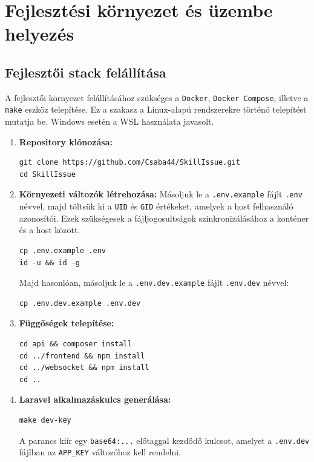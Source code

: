 \chapter{Fejlesztési környezet és üzembe helyezés}

\section{Fejlesztői stack felállítása}
A fejlesztői környezet felállításához szükséges a \texttt{Docker}, \texttt{Docker Compose}, illetve a \texttt{make} eszköz telepítése. Ez a szakasz a Linux-alapú rendszerekre történő telepítést mutatja be. Windows esetén a WSL használata javasolt.

\begin{enumerate}
    \item \textbf{Repository klónozása:}
    \begin{verbatim}
git clone https://github.com/Csaba44/SkillIssue.git
cd SkillIssue
    \end{verbatim}

    \item \textbf{Környezeti változók létrehozása:}
    Másoljuk le a \texttt{.env.example} fájlt \texttt{.env} névvel, majd töltsük ki a \texttt{UID} és \texttt{GID} értékeket, amelyek a host felhasználó azonosítói. Ezek szükségesek a fájljogosultságok szinkronizálásához a konténer és a host között.
    \begin{verbatim}
cp .env.example .env
id -u && id -g
    \end{verbatim}

    Majd hasonlóan, másoljuk le a \texttt{.env.dev.example} fájlt \texttt{.env.dev} névvel:
    \begin{verbatim}
cp .env.dev.example .env.dev
    \end{verbatim}

    \item \textbf{Függőségek telepítése:}
    \begin{verbatim}
cd api && composer install
cd ../frontend && npm install
cd ../websocket && npm install
cd ..
    \end{verbatim}

    \item \textbf{Laravel alkalmazáskulcs generálása:}
    \begin{verbatim}
make dev-key
    \end{verbatim}
    A parancs kiír egy \texttt{base64:...} előtaggal kezdődő kulcsot, amelyet a \texttt{.env.dev} fájlban az \texttt{APP\_KEY} változóhoz kell rendelni.


\end{enumerate}
